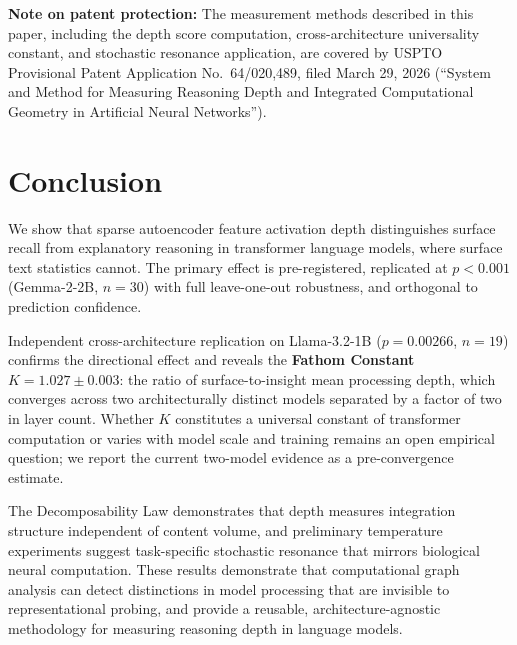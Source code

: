 \documentclass[10pt]{article}
\begin{document}
\textbf{Note on patent protection:} The measurement methods described in this paper, including the depth score computation, cross-architecture universality constant, and stochastic resonance application, are covered by USPTO Provisional Patent Application No.~64/020,489, filed March 29, 2026 (``System and Method for Measuring Reasoning Depth and Integrated Computational Geometry in Artificial Neural Networks'').

\section{Conclusion}

We show that sparse autoencoder feature activation depth distinguishes surface recall from explanatory reasoning in transformer language models, where surface text statistics cannot. The primary effect is pre-registered, replicated at $p < 0.001$ (Gemma-2-2B, $n{=}30$) with full leave-one-out robustness, and orthogonal to prediction confidence.

Independent cross-architecture replication on Llama-3.2-1B ($p{=}0.00266$, $n{=}19$) confirms the directional effect and reveals the \textbf{Fathom Constant} $K{=}1.027 \pm 0.003$: the ratio of surface-to-insight mean processing depth, which converges across two architecturally distinct models separated by a factor of two in layer count. Whether $K$ constitutes a universal constant of transformer computation or varies with model scale and training remains an open empirical question; we report the current two-model evidence as a pre-convergence estimate.

The Decomposability Law demonstrates that depth measures integration structure independent of content volume, and preliminary temperature experiments suggest task-specific stochastic resonance that mirrors biological neural computation. These results demonstrate that computational graph analysis can detect distinctions in model processing that are invisible to representational probing, and provide a reusable, architecture-agnostic methodology for measuring reasoning depth in language models.



\end{document}
